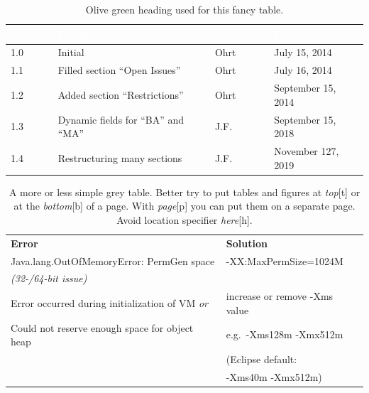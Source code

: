 \begin{center}
  \begin{table}[tp]
    \begin{tabularx}{\textwidth}{|l|l|p{}|X|}\hline
      \rowcolor{olivegreen30}
      \textcolor{white}{\textbf{Version}}
         &\textcolor{white}{\textbf{Description}}
           &  \textcolor{white}{\textbf{Author(s)}}
             &\textcolor{white}{\textbf{Date}}\\
      \hline
      1.0
        & Initial
          & Ohrt
            & July 15, 2014\\
      \hline
      1.1
        & Filled section ``Open Issues''
          & Ohrt
            & July 16, 2014\\
      \hline
      1.2
        & Added section ``Restrictions''
          & Ohrt
            & September 15, 2014\\
      \hline
      1.3
        & Dynamic fields for ``BA'' and ``MA''
          & J.F.
            & September 15, 2018\\
      \hline
      1.4
        & Restructuring many sections
          & J.F.
            & November 127, 2019\\
      \hline
      \end{tabularx}
    \caption[Fancy Table]{Olive green heading used for this fancy table.}
    \label{tab:olive}
  \end{table}
\end{center}

 \begin{center}
  \begin{table}[tbp]
    \begin{tabular}{ l | l }
      \rowcolor{gray20}\textbf{Error}
        & \textbf{Solution} \\
      \rowcolor{gray5}Java.lang.OutOfMemoryError: PermGen space
        & -XX:MaxPermSize=1024M \\
      \rowcolor{gray5}\textit{(32-/64-bit issue)}
        & \\
      \rowcolor{gray20}Error occurred during initialization of VM \textit{or}
        & increase or remove -Xms value \\
      \rowcolor{gray20}Could not reserve enough space for object heap
        & e.g.\ -Xms128m -Xmx512m \\
      \rowcolor{gray20}
        & \small{(Eclipse default:}\\
      \rowcolor{gray20}
        & \small{-Xms40m -Xmx512m)} \\
    \end{tabular}
    \caption[Simple Grey Table]
            {A more or less simple grey table. Better try to put tables and
             figures at \textit{top}[t] or at the \textit{bottom}[b] of a
             page. With \textit{page}[p] you can put them on a separate page.
             Avoid location specifier \textit{here}[h].}
    \label{tab:grey}
  \end{table}
\end{center}


